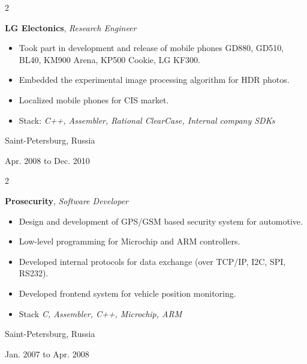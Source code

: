 \documentclass[10pt, letterpaper]{article}
\newenvironment{highlights}{
    \begin{itemize}[
        topsep=0.10 cm,
        parsep=0.10 cm,
        partopsep=0pt,
        itemsep=0pt,
        leftmargin=0.4 cm + 10pt
    ]
}{
    \end{itemize}
} %
\newenvironment{twocolentry}[2][]{
    \onecolentry
    \def\secondColumn{#2}
    \setcolumnwidth{\fill, 4.5 cm}
    \begin{paracol}{2}
}{
    \switchcolumn \raggedleft \secondColumn
    \end{paracol}
    \endonecolentry
} %
\begin{document}
        \vspace{0.2 cm}

        \begin{twocolentry}{
            Saint-Petersburg, Russia

        Apr. 2008 to Dec. 2010
        }
            \textbf{LG Electonics}, \textit{Research Engineer}
            \begin{highlights}
                \item Took part in development and release of mobile phones GD880, GD510, BL40, KM900 Arena, KP500 Cookie, LG KF300.
                \item Embedded the experimental image processing algorithm for HDR photos.
                \item Localized mobile phones for CIS market.
                \item Stack: \textit{C++, Assembler, Rational ClearCase, Internal company SDKs}
            \end{highlights}
        \end{twocolentry}


        \vspace{0.2 cm}

        \begin{twocolentry}{
            Saint-Petersburg, Russia

        Jan. 2007 to Apr. 2008
        }
            \textbf{Prosecurity}, \textit{Software Developer}
            \begin{highlights}
                \item Design and development of GPS/GSM based security system for automotive.
                \item Low-level programming for Microchip and ARM controllers.
                \item Developed internal protocols for data exchange (over TCP/IP, I2C, SPI, RS232).
                \item Developed frontend system for vehicle position monitoring.
                \item Stack \textit{C, Assembler, C++, Microchip, ARM}
            \end{highlights}
        \end{twocolentry}


        \vspace{0.2 cm}
\end{document}
